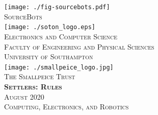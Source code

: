 \documentclass[twoside,12pt,a4paper,titlepage]{article}
\title{\gamename}
\author{\org}
\date{\timeline}
\newcommand{\gamename}{Settlers\xspace}
\newcommand{\timeline}{August 2020\xspace}
\begin{document}
\begin{titlepage}
\begin{center}
\texttt{[image: ./fig-sourcebots.pdf]}~\\[1cm]
\textsc{\large SourceBots}~\\[1.8cm]
\texttt{[image: ./soton\_logo.eps]}~\\[1cm]
\textsc{\large Electronics and Computer Science}\\[0.2cm]
\textsc{\large Faculty of Engineering and Physical Sciences}\\[0.2cm]
\textsc{\large University of Southampton}\\[1.8cm]
\texttt{[image: ./smallpeice\_logo.jpg]}~\\[0.2cm]
\textsc{\large The Smallpeice Trust}\\[1.8cm]
\textsc{\huge \textbf{\gamename{}: Rules}}\\[1cm]
\textsc{\large \timeline}\\[1.2cm]
\textsc{\Large Computing, Electronics, and Robotics}
\end{center}
\end{titlepage}


\clearpage

\clearpage

\end{document}
